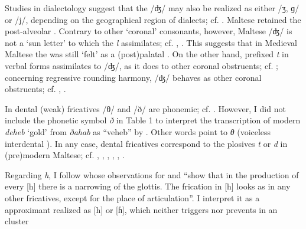 \documentclass[output=paper]{langsci/langscibook}
\begin{document}

Studies in  dialectology suggest that the  /ʤ/ may also be realized as either /ʒ, ɡ/ or /j/, depending on the geographical region of dialects; cf. \citet{Kaye1972}. Maltese retained the post-alveolar  . Contrary to other ‘coronal’ consonants, however, Maltese /ʤ/ is not a ‘sun letter’ to which the  \textit{l} assimilates; cf. \citet[18]{Sutcliffe1936}, \citet[25]{Comrie1980}. This suggests that in Medieval Maltese the  was still ‘felt’ as a  (post)palatal . On the other hand, prefixed \textit{t} in verbal forms assimilates to /ʤ/, as it does to other coronal obstruents; cf. \citet[chapter V]{Sutcliffe1936}; concerning regressive rounding  harmony, /ʤ/ behaves as other coronal obstruents; cf. \citet{Sutcliffe1936}, \citet[387]{Puech1978}.

In  dental (weak) fricatives /θ/ and /ð/ are phonemic; cf. \citet[2-3]{AlKhairy2005}. However, I did not include the phonetic symbol \textit{ð} in Table 1 to interpret the transcription of modern \textit{deheb} ‘gold’ from  \textit{ðahab} as ``veheb'' by \citet[20, word 42]{Megiser1606}. Other words point to \textit{θ} (voiceless interdental ). In any case, dental fricatives correspond to the plosives \textit{t} or \textit{d} in (pre)modern Maltese; cf. \citet[127]{Aquilina1961}, \citet[220]{Cowan1964}, \citet[82, note 75]{Cassola1987}, \citet[241]{Comrie1991}, \citet[17]{Kontzi1994}, \citet[243-44]{Brincat2011}. 

Regarding  \textit{h}, I follow \citet[92]{Laufer1991} whose observations for  and  “show that in the production of every [h] there is a narrowing of the glottis. The frication in [h] looks as in any other fricatives, except for the place of articulation”. 
I interpret it as a  approximant realized as [h] or [ɦ], which neither triggers nor prevents  in an  cluster
\end{document}
